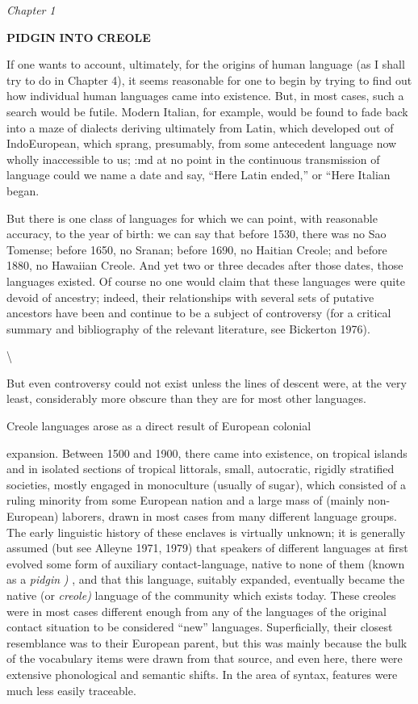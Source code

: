 \textit{Chapter} \textit{1}

\textbf{PIDGIN} \textbf{INTO} \textbf{CREOLE}

If one wants to account, ultimately, for the origins of human language (as I shall try to do in Chapter 4), it seems reasonable for one to begin by trying to find out how individual human languages came into existence. But, in most cases, such a search would be futile. Mod\-ern Italian, for example, would be found to fade back into a maze of dialects deriving ultimately from Latin, which developed out of Indo\-European, which sprang, presumably, from some antecedent language now wholly inaccessible to us; :md at no point in the continuous transmission of language could we name a date and say, ``Here Latin ended,'' or ``Here Italian began.{\textquotedbl}

But there is one class of languages for which we can point, with reasonable accuracy, to the year of birth: we can say that before 1530, there was no Sao Tomense; before 1650, no Sranan; before 1690, no Haitian Creole; and before 1880, no Hawaiian Creole. And yet two or three decades after those dates, those languages existed. Of course no one would claim that these languages were quite devoid of ancestry; indeed, their relationships with several sets of putative ancestors have been and continue to be a subject of controversy (for a critical sum\-mary and bibliography of the relevant literature, see Bickerton 1976).

{\textbackslash}


But even controversy could not exist unless the lines of descent were, at the very least, considerably more obscure than they are for most other languages.

Creole languages arose as a direct result of European colonial

expansion. Between 1500 and 1900, there came into existence, on tropical islands and in isolated sections of tropical littorals, small, autocratic, rigidly stratified societies, mostly engaged in monoculture (usually of sugar), which consisted of a ruling minority from some European nation and a large mass of (mainly non-European) laborers, drawn in most cases from many different language groups. The early linguistic history of these enclaves is virtually unknown; it is generally assumed (but see Alleyne 1971, 1979) that speakers of different lan\-guages at first evolved some form of auxiliary contact-language, native to none of them (known as a \textit{pidgin} \textit{)} , and that this language, suitably expanded, eventually became the native (or \textit{creol}\textit{e}\textit{) }language of the community which exists today. These creoles were in most cases different enough from any of the languages of the original contact situation to be considered ``new'' languages. Superficially, their closest resemblance was to their European parent, but this was mainly because the bulk of the vocabulary items were drawn from that source, and even here, there were extensive phonological and semantic shifts. In the area of syntax, features were much less easily traceable.

